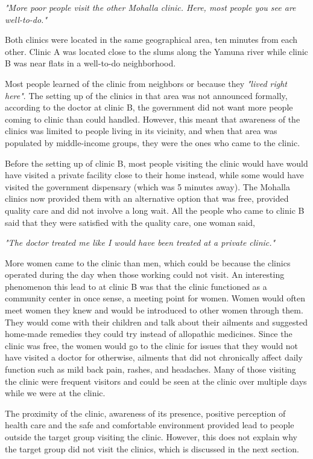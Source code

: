 \textit{"More poor people visit the other Mohalla clinic. Here, most people you see are well-to-do."} 

Both clinics were located in the same geographical area, ten minutes from each other. Clinic A was located close to the slums along the Yamuna river while clinic B was near flats in a well-to-do neighborhood. %

Most people learned of the clinic from neighbors or because they \textit{"lived right here"}. The setting up of the clinics in that area was not announced formally, according to the doctor at clinic B, the government did not want more people coming to clinic than could handled. However, this meant that awareness of the clinics was limited to people living in its vicinity, and when that area was populated by middle-income groups, they were the ones who came to the clinic.

Before the setting up of clinic B, most people visiting the clinic would have would have visited a private facility close to their home instead, while some would have visited the government dispensary (which was 5 minutes away). The Mohalla clinics now provided them with an alternative option that was free, provided quality care and did not involve a long wait. All the people who came to clinic B said that they were satisfied with the quality care, one woman said,

\textit{"The doctor treated me like I would have been treated at a private clinic."}

More women came to the clinic than men, which could be because the clinics operated during the day when those working could not visit. An interesting phenomenon this lead to at clinic B was that the clinic functioned as a community center in once sense, a meeting point for women. Women would often meet women they knew and would be introduced to other women through them. They would come with their children and talk about their ailments and suggested home-made remedies they could try instead of allopathic medicines. Since the clinic was free, the women would go to the clinic for issues that they would not have visited a doctor for otherwise, ailments that did not chronically affect daily function such as mild back pain, rashes, and headaches. Many of those visiting the clinic were frequent visitors and could be seen at the clinic over multiple days while we were at the clinic. 

The proximity of the clinic, awareness of its presence, positive perception of health care and the safe and comfortable environment provided lead to people outside the target group visiting the clinic. However, this does not explain why the target group did not visit the clinics, which is discussed in the next section. 

